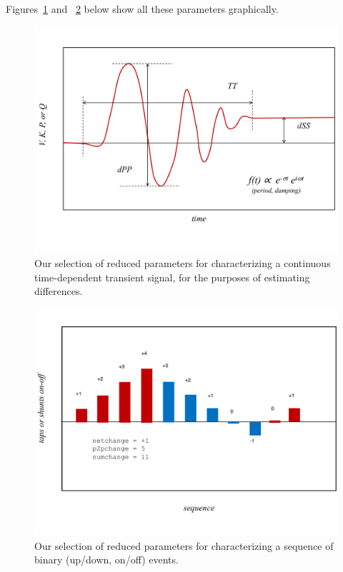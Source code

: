 \documentclass[conference]{IEEEtran}
\begin{document}
Figures~\ref{fig:tcharacteristics1} and ~\ref{fig:tcharacteristics2} below show
all these parameters graphically.

\begin{figure}
  \centering
  \includegraphics[width=\columnwidth]{figs/transient_characteristics_1}
  \caption{Our selection of reduced parameters for characterizing a
    continuous time-dependent transient signal, for the purposes of
    estimating differences.}
  \label{fig:tcharacteristics1}
\end{figure}

\begin{figure}
  \centering
  \includegraphics[width=\columnwidth]{figs/transient_characteristics_2}
  \caption{Our selection of reduced parameters for characterizing a
    sequence of binary (up/down, on/off) events.}
  \label{fig:tcharacteristics2}
\end{figure}
\end{document}
